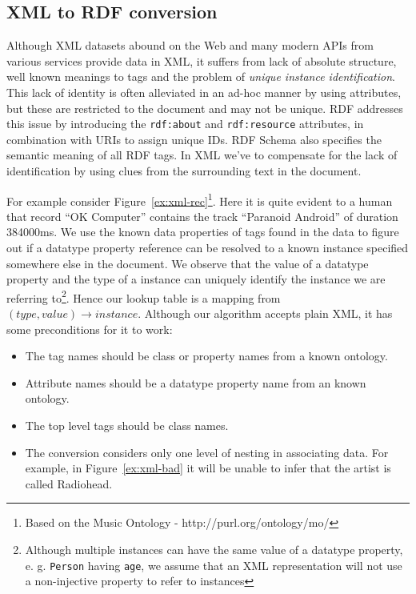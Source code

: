 \documentclass[journal]{IEEEtran}
\begin{document}
\subsection{XML to RDF conversion}

Although XML datasets abound on the Web and many modern APIs from various
services provide data in XML, it suffers from lack of absolute structure, well
known meanings to tags and the problem of \emph{unique instance
identification}. This lack of identity is often alleviated in an ad-hoc manner
by using attributes, but these are restricted to the document and may not be
unique. RDF addresses this issue by introducing the \texttt{rdf:about} and
\texttt{rdf:resource} attributes, in combination with URIs to assign unique
IDs. RDF Schema also specifies the semantic meaning of all RDF tags. In XML
we've to compensate for the lack of identification by using clues from the
surrounding text in the document.

For example consider Figure~\ref{ex:xml-rec}\footnote{Based on the Music
Ontology - http://purl.org/ontology/mo/}. Here it is quite evident to a human
that record ``OK Computer'' contains the track ``Paranoid Android'' of duration
384000ms. We use the known data properties of tags found in the data to figure
out if a datatype property reference can be resolved to a known instance
specified somewhere else in the document. We observe that the value of
a datatype property and the type of a instance can uniquely identify the
instance we are referring to\footnote{Although multiple instances can have the
    same value of a datatype property, e. g. \texttt{Person} having
    \texttt{age}, we assume that an XML representation will not use
a non-injective property to refer to instances}. Hence our lookup table is
a mapping from $(type, value)\rightarrow instance$. Although our algorithm
accepts plain XML, it has some preconditions for it to work:

\begin{itemize}
    \item The tag names should be class or property names from a known ontology.
    \item Attribute names should be a datatype property name from an known
        ontology.
    \item The top level tags should be class names.
    \item The conversion considers only one level of nesting in associating
        data. For example, in Figure~\ref{ex:xml-bad} it will be unable to
        infer that the artist is called Radiohead.
\end{itemize}
\end{document}
